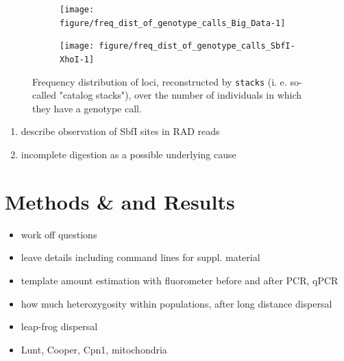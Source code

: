 \documentclass[a4paper,12pt,times,print,index, custombib]{PhDThesisPSnPDF}\usepackage[]{graphicx}\usepackage[]{color}
\newenvironment{knitrout}{}{} %
\begin{document}
\begin{figure}
\centering
\begin{subfigure}[t]{.495\textwidth}
\begin{knitrout}
\color{fgcolor}

{\centering \texttt{[image: figure/freq\_dist\_of\_genotype\_calls\_Big\_Data-1]} 

}



\end{knitrout}
\caption{}
\label{Big_Data:freq_dist_of_genotype_calls}
\end{subfigure}
\hfill
\begin{subfigure}[t]{.495\textwidth}
\begin{knitrout}
\color{fgcolor}

{\centering \texttt{[image: figure/freq\_dist\_of\_genotype\_calls\_SbfI-XhoI-1]} 

}



\end{knitrout}
\caption{}
\label{ddRAD:freq_dist_of_genotype_calls}
\end{subfigure}
\caption{Frequency distribution of loci, reconstructed by \texttt{stacks} (i. e. so-called "catalog stacks"), over the number of individuals in which they have a genotype call.}
\end{figure}



\begin{enumerate}
\item describe observation of SbfI sites in RAD reads
\item incomplete digestion as a possible underlying cause
\end{enumerate}


\section{Methods \& and Results}

\begin{itemize}
\item work off questions
\item leave details including command lines for suppl. material
\item template amount estimation with fluorometer before and after PCR, qPCR
\item how much heterozygosity within populations, after long distance dispersal
\item leap-frog dispersal
\item Lunt, Cooper, Cpn1, mitochondria
\end{itemize}
\end{document}
